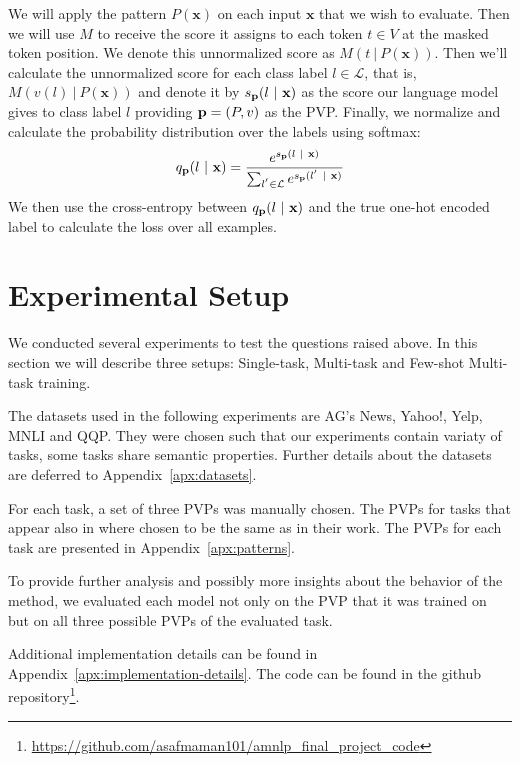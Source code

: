\documentclass[11pt,a4paper]{article}
\begin{document}
We will apply the pattern $P(\textbf{x})$ on each input $\textbf{x}$ that we wish to evaluate.
Then we will use $M$ to receive the score it assigns to each token $t\in{}V$ at the masked token position.
We denote this unnormalized score as $M(t\ |\ P(\textbf{x}))$.
Then we'll calculate the unnormalized score for each class label $l\in{}\mathcal{L}$, that is, $M(v(l)\ |\ P(\textbf{x}))$ and denote it by $s_{\text{\textbf{p}}}(l\ |\ \textbf{x})$ as the score our language model gives to class label $l$ providing $\text{\textbf{p}}=(P, v)$ as the PVP.
Finally, we normalize and calculate the probability distribution over the labels using softmax:
\[
	q_\text{\textbf{p}}(l\ |\ \textbf{x}) = \frac{e^{s_{\text{\textbf{p}}}(l\ |\ \textbf{x})}}{\sum_{l^{'}\in{}\mathcal{L}}e^{s_{\text{\textbf{p}}}(l^{'}\ |\ \textbf{x})}}
\]
We then use the cross-entropy between $q_\text{\textbf{p}}(l\ |\ \textbf{x})$ and the true one-hot encoded label to calculate the loss over all examples. 

\section{Experimental Setup}
\label{sec:experiments}



We conducted several experiments to test the questions raised above.
In this section we will describe three setups: Single-task, Multi-task and Few-shot Multi-task training.

The datasets used in the following experiments are AG's News, Yahoo!, Yelp, MNLI and QQP.
They were chosen such that our experiments contain variaty of tasks, some tasks share semantic properties.
Further details about the datasets are deferred to Appendix~\ref{apx:datasets}.

For each task, a set of three PVPs was manually chosen.
The PVPs for tasks that appear also in \citet{schick2020exploiting} where chosen to be the same as in their work.
The PVPs for each task are presented in Appendix~\ref{apx:patterns}.

To provide further analysis and possibly more insights about the behavior of the method, we evaluated each model not only on the PVP that it was trained on but on all three possible PVPs of the evaluated task.

Additional implementation details can be found in Appendix~\ref{apx:implementation-details}.
The code can be found in the github repository\footnote{\url{https://github.com/asafmaman101/amnlp_final_project_code}}.
\end{document}
